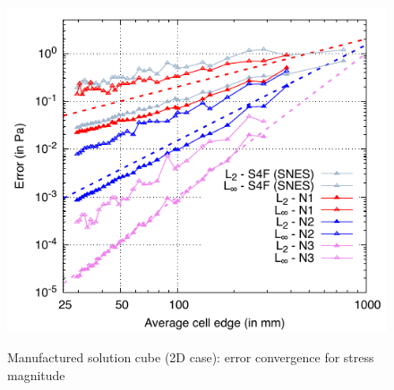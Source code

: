 \documentclass[sn-mathphys,Numbered]{sn-jnl}%
\begin{document}
\begin{figure}[H]
{    		\includegraphics[scale=0.8]{figures/mms/2D/mms_stressErrors_ho-tet-unstruct}  
    }
 	\caption{Manufactured solution cube (2D case): error convergence for stress magnitude}
 	\label{fig:jj}
 \end{figure}
  
\end{document}
